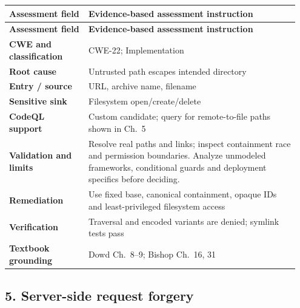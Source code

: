 \documentclass[11pt,letterpaper,oneside]{book}
\begin{document}
\small
\setlength{\tabcolsep}{2pt}
\renewcommand{\arraystretch}{1.18}
\begin{longtable}{>{\raggedright\arraybackslash}p{0.26\linewidth}>{\raggedright\arraybackslash}p{0.69\linewidth}}
\toprule
\textbf{Assessment field} & \textbf{Evidence-based assessment instruction}\\
\midrule
\endfirsthead
\toprule
\textbf{Assessment field} & \textbf{Evidence-based assessment instruction}\\
\midrule
\endhead
\textbf{CWE and classification} & CWE-22; Implementation\\
\textbf{Root cause} & Untrusted path escapes intended directory\\
\textbf{Entry / source} & URL, archive name, filename\\
\textbf{Sensitive sink} & Filesystem open/create/delete\\
\textbf{CodeQL support} & Custom candidate; query for remote-to-file paths shown in Ch.~5\\
\textbf{Validation and limits} & Resolve real paths and links; inspect containment race and permission boundaries. Analyze unmodeled frameworks, conditional guards and deployment specifics before deciding.\\
\textbf{Remediation} & Use fixed base, canonical containment, opaque IDs and least-privileged filesystem access\\
\textbf{Verification} & Traversal and encoded variants are denied; symlink tests pass\\
\textbf{Textbook grounding} & Dowd Ch.~8--9; Bishop Ch.~16, 31\\
\bottomrule
\end{longtable}
\normalsize

\subsection{5. Server-side request forgery}
\end{document}
